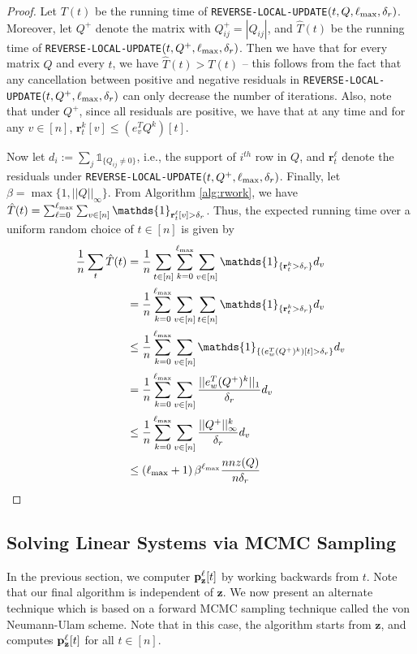 \begin{proof}
Let $T(t)$ be the running time of \texttt{REVERSE-LOCAL-UPDATE}$(t,Q,\ell_{\max},\delta_r)$.
Moreover, let $Q^+$ denote the matrix with $Q^+_{ij} = |Q_{ij}|$, and $\hat{T}(t)$ be the running time of \texttt{REVERSE-LOCAL-UPDATE}$(t,Q^+,\ell_{\max},\delta_r)$. 
Then we have that for every matrix $Q$ and every $t$, we have $\hat{T}(t)>T(t)$ -- this follows from the fact that any cancellation between positive and negative residuals in \texttt{REVERSE-LOCAL-UPDATE}$(t,Q^+,\ell_{\max},\delta_r)$ can only decrease the number of iterations. 
Also, note that under $Q^+$, since all residuals are positive, we have that at any time and for any $v\in[n]$, $\mathbf{r}_t^{k}[v]\leq \left(e_v^TQ^k\right)[t]$.

Now let $d_i := \sum_j\mathds{1}_{\{Q_{ij}\neq 0\}}$, i.e., the support of $i^{th}$ row in $Q$, and $\mathbf{r}_t^{\ell}$ denote the residuals under \texttt{REVERSE-LOCAL-UPDATE}$(t,Q^+,\ell_{\max},\delta_r)$. 
Finally, let $\beta = \max\{1,||Q||_{\infty}\}$.
From Algorithm \ref{alg:rwork}, we have $\hat{T}(t) = \sum_{\ell=0}^{\lm}\sum_{v\in[n]}\mathds{1}_{\mathbf{r}_t^{\ell}[v]>\delta_r}$.
Thus, the expected running time over a uniform random choice of $t\in[n]$ is given by
\begin{align*}
\frac{1}{n}\sum_t\hat{T}(t) &= \frac{1}{n}\sum_{t\in[n]}\sum_{k=0}^{\lm}\sum_{v\in[n]}\mathds{1}_{\{\mathbf{r}_t^{k}>\delta_r\}}d_v\\
&=\frac{1}{n}\sum_{k=0}^{\lm}\sum_{v\in[n]}\sum_{t\in[n]}\mathds{1}_{\{\mathbf{r}_t^{k}>\delta_r\}}d_v\\
&\leq\frac{1}{n}\sum_{k=0}^{\lm}\sum_{v\in[n]} \mathds{1}_{\{\left(e_w^T(Q^+)^k\right)[t]>\delta_r\}}d_v\\
&=\frac{1}{n}\sum_{k=0}^{\lm}\sum_{v\in[n]} \frac{||e_w^T(Q^+)^k||_1}{\delta_r}d_v\\
&\leq\frac{1}{n}\sum_{k=0}^{\lm}\sum_{v\in[n]} \frac{||Q^+||_{\infty}^k}{\delta_r}d_v\\
&\leq\left(\lm+1\right)\beta^{\lm} \frac{nnz(Q)}{n\delta_r}
\end{align*}
\end{proof}


\subsection{Solving Linear Systems via MCMC Sampling}
\label{ssec:forwardwork}


In the previous section, we computer ${\mathbf{p}}_\mathbf{z}^{\ell}[t]$ by working backwards from $t$. 
Note that our final algorithm is independent of $\mathbf{z}$.
We now present an alternate technique which is based on a forward MCMC sampling technique called the von Neumann-Ulam scheme. 
Note that in this case, the algorithm starts from $\mathbf{z}$, and computes ${\mathbf{p}}_\mathbf{z}^{\ell}[t]$ for all $t\in[n]$.

